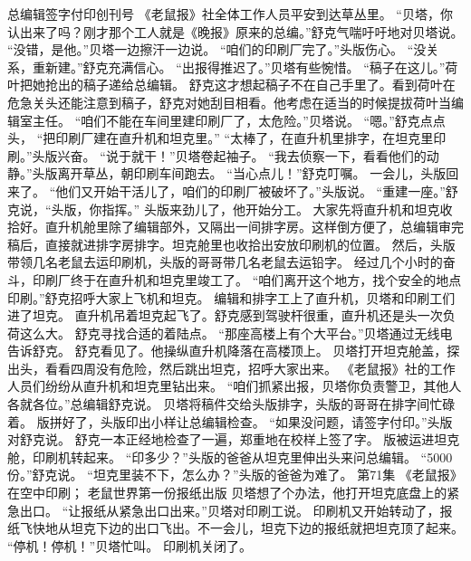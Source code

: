 \documentclass[a4paper,12pt,UTF8,twoside]{ctexbook}
\begin{document}
        总编辑签字付印创刊号   
        《老鼠报》社全体工作人员平安到达草丛里。 
        “贝塔，你认出来了吗？刚才那个工人就是《晚报》原来的总编。”舒克气喘吁吁地对贝塔说。 
        “没错，是他。”贝塔一边擦汗一边说。 
        “咱们的印刷厂完了。”头版伤心。 
        “没关系，重新建。”舒克充满信心。 
        “出报得推迟了。”贝塔有些惋惜。 
        “稿子在这儿。”荷叶把她抢出的稿子递给总编辑。 
        舒克这才想起稿子不在自己手里了。看到荷叶在危急关头还能注意到稿子，舒克对她刮目相看。他考虑在适当的时候提拔荷叶当编辑室主任。 
        “咱们不能在车间里建印刷厂了，太危险。”贝塔说。 
        “嗯。”舒克点点头，  “把印刷厂建在直升机和坦克里。” 
        “太棒了，在直升机里排字，在坦克里印刷。”头版兴奋。 
        “说于就干！”贝塔卷起袖子。 
        “我去侦察一下，看看他们的动静。”头版离开草丛，朝印刷车间跑去。 
        “当心点儿！”舒克叮嘱。 
        一会儿，头版回来了。 
        “他们又开始干活儿了，咱们的印刷厂被破坏了。”头版说。 
        “重建一座。”舒克说，“头版，你指挥。” 
        头版来劲儿了，他开始分工。 
        大家先将直升机和坦克收拾好。直升机舱里除了编辑部外，又隔出一间排字房。这样倒方便了，总编辑审完稿后，直接就进排字房排字。坦克舱里也收拾出安放印刷机的位置。 
        然后，头版带领几名老鼠去运印刷机，头版的哥哥带几名老鼠去运铅字。 
        经过几个小时的奋斗，印刷厂终于在直升机和坦克里竣工了。 
        “咱们离开这个地方，找个安全的地点印刷。”舒克招呼大家上飞机和坦克。 
        编辑和排字工上了直升机，贝塔和印刷工们进了坦克。 
        直升机吊着坦克起飞了。舒克感到驾驶杆很重，直升机还是头一次负荷这么大。 
        舒克寻找合适的着陆点。 
        “那座高楼上有个大平台。”贝塔通过无线电告诉舒克。 
        舒克看见了。他操纵直升机降落在高楼顶上。 
        贝塔打开坦克舱盖，探出头，看看四周没有危险，然后跳出坦克，招呼大家出来。 
        《老鼠报》社的工作人员们纷纷从直升机和坦克里钻出来。 
        “咱们抓紧出报，贝塔你负责警卫，其他人各就各位。”总编辑舒克说。 
        贝塔将稿件交给头版排字，头版的哥哥在排字间忙碌着。 
        版拼好了，头版印出小样让总编辑检查。 
        “如果没问题，请签字付印。”头版对舒克说。 
        舒克一本正经地检查了一遍，郑重地在校样上签了字。 
        版被运进坦克舱，印刷机转起来。 
        “印多少？”头版的爸爸从坦克里伸出头来问总编辑。 
        “5000份。”舒克说。 
        “坦克里装不下，怎么办？”头版的爸爸为难了。   第71集 
        《老鼠报》在空中印刷； 
        老鼠世界第一份报纸出版   
        贝塔想了个办法，他打开坦克底盘上的紧急出口。 
        “让报纸从紧急出口出来。”贝塔对印刷工说。 
        印刷机又开始转动了，报纸飞快地从坦克下边的出口飞出。不一会儿，坦克下边的报纸就把坦克顶了起来。 
        “停机！停机！”贝塔忙叫。 
        印刷机关闭了。 
\end{document}
